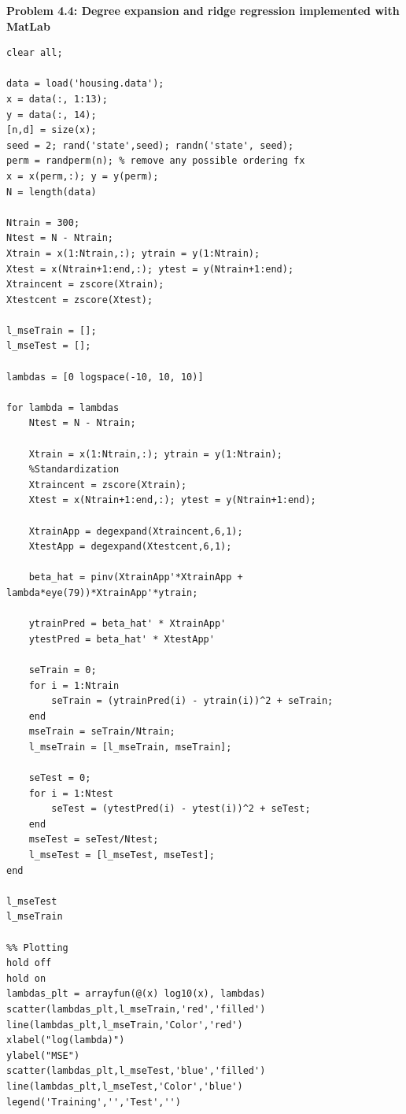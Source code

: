 \documentclass[11pt]{article}
\begin{document}
\textbf{Problem 4.4: Degree expansion and ridge regression implemented with MatLab}\\

\begin{verbatim}
clear all;

data = load('housing.data');
x = data(:, 1:13);
y = data(:, 14);
[n,d] = size(x);
seed = 2; rand('state',seed); randn('state', seed);
perm = randperm(n); % remove any possible ordering fx
x = x(perm,:); y = y(perm);
N = length(data)

Ntrain = 300;
Ntest = N - Ntrain;
Xtrain = x(1:Ntrain,:); ytrain = y(1:Ntrain);
Xtest = x(Ntrain+1:end,:); ytest = y(Ntrain+1:end);
Xtraincent = zscore(Xtrain);
Xtestcent = zscore(Xtest);

l_mseTrain = [];
l_mseTest = [];

lambdas = [0 logspace(-10, 10, 10)]

for lambda = lambdas
    Ntest = N - Ntrain;

    Xtrain = x(1:Ntrain,:); ytrain = y(1:Ntrain);
    %Standardization
    Xtraincent = zscore(Xtrain); 
    Xtest = x(Ntrain+1:end,:); ytest = y(Ntrain+1:end);

    XtrainApp = degexpand(Xtraincent,6,1);
    XtestApp = degexpand(Xtestcent,6,1);
    
    beta_hat = pinv(XtrainApp'*XtrainApp + lambda*eye(79))*XtrainApp'*ytrain;

    ytrainPred = beta_hat' * XtrainApp'
    ytestPred = beta_hat' * XtestApp'

    seTrain = 0;
    for i = 1:Ntrain
        seTrain = (ytrainPred(i) - ytrain(i))^2 + seTrain;
    end
    mseTrain = seTrain/Ntrain;
    l_mseTrain = [l_mseTrain, mseTrain];
    
    seTest = 0;
    for i = 1:Ntest
        seTest = (ytestPred(i) - ytest(i))^2 + seTest;
    end
    mseTest = seTest/Ntest;
    l_mseTest = [l_mseTest, mseTest];
end

l_mseTest
l_mseTrain

%% Plotting
hold off
hold on
lambdas_plt = arrayfun(@(x) log10(x), lambdas)
scatter(lambdas_plt,l_mseTrain,'red','filled')
line(lambdas_plt,l_mseTrain,'Color','red')
xlabel("log(lambda)")
ylabel("MSE")
scatter(lambdas_plt,l_mseTest,'blue','filled')
line(lambdas_plt,l_mseTest,'Color','blue')
legend('Training','','Test','')


\end{verbatim}
\end{document}
